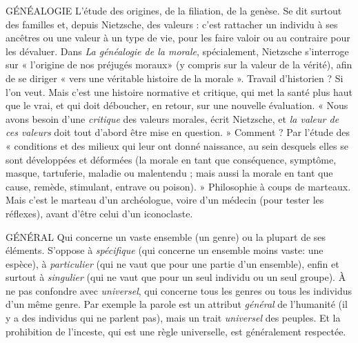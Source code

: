GÉNÉALOGIE L'étude des origines, de la filiation, de la genèse. Se dit surtout
des familles et, depuis Nietzsche, des valeurs : c’est rattacher
un individu à ses ancêtres ou une valeur à un type de vie, pour les faire
valoir ou au contraire pour les dévaluer. Dans {\it La généalogie de la morale}, spécialement,
Nietzsche s'interroge sur « l’origine de nos préjugés moraux» (y
compris sur la valeur de la vérité), afin de se diriger « vers une véritable histoire
de la morale ». Travail d’historien ? Si l’on veut. Mais c’est une histoire normative
et critique, qui met la santé plus haut que le vrai, et qui doit déboucher, en
retour, sur une nouvelle évaluation. « Nous avons besoin d’une {\it critique} des
valeurs morales, écrit Nietzsche, et {\it la valeur de ces valeurs} doit tout d’abord être
mise en question. » Comment ? Par l’étude des « conditions et des milieux qui
leur ont donné naissance, au sein desquels elles se sont développées et déformées
(la morale en tant que conséquence, symptôme, masque, tartuferie,
maladie ou malentendu ; mais aussi la morale en tant que cause, remède, stimulant,
entrave ou poison). » Philosophie à coups de marteaux. Mais c’est le
marteau d’un archéologue, voire d’un médecin (pour tester les réflexes), avant
d’être celui d’un iconoclaste.

GÉNÉRAL Qui concerne un vaste ensemble (un genre) ou la plupart de ses
éléments. S'oppose à {\it spécifique} (qui concerne un ensemble moins
vaste: une espèce), à {\it particulier} (qui ne vaut que pour une partie d’un
ensemble), enfin et surtout à {\it singulier} (qui ne vaut que pour un seul individu
ou un seul groupe). À ne pas confondre avec {\it universel}, qui concerne tous les
genres ou tous les individus d’un même genre. Par exemple la parole est un
attribut {\it général} de l'humanité (il y a des individus qui ne parlent pas), mais un
trait {\it universel} des peuples. Et la prohibition de l'inceste, qui est une règle universelle,
est généralement respectée.

